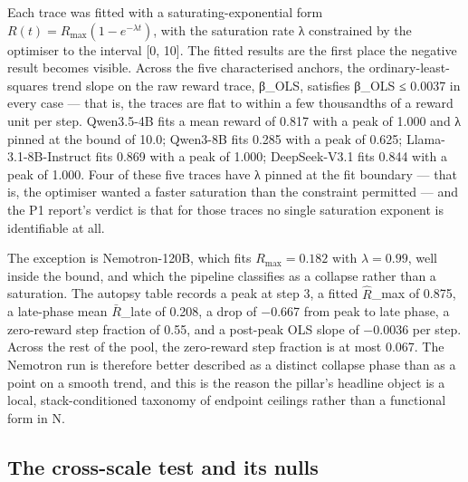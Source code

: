 \documentclass[12pt,a4paper]{report}
\begin{document}
Each trace was fitted with a saturating-exponential form
\(R(t) = R_{\max}(1 - e^{-\lambda t})\), with the saturation rate λ
constrained by the optimiser to the interval {[}0, 10{]}. The fitted
results are the first place the negative result becomes visible. Across
the five characterised anchors, the ordinary-least-squares trend slope
on the raw reward trace, β\_OLS, satisfies \textbar β\_OLS\textbar{} ≤
0.0037 in every case --- that is, the traces are flat to within a few
thousandths of a reward unit per step. Qwen3.5-4B fits a mean reward of
0.817 with a peak of 1.000 and λ pinned at the bound of 10.0; Qwen3-8B
fits 0.285 with a peak of 0.625; Llama-3.1-8B-Instruct fits 0.869 with a
peak of 1.000; DeepSeek-V3.1 fits 0.844 with a peak of 1.000. Four of
these five traces have λ pinned at the fit boundary --- that is, the
optimiser wanted a faster saturation than the constraint permitted ---
and the P1 report's verdict is that for those traces no single
saturation exponent is identifiable at all.

The exception is Nemotron-120B, which fits \(R_{\max} = 0.182\) with
\(\lambda = 0.99\), well inside the bound, and which the pipeline
classifies as a collapse rather than a saturation. The autopsy table
records a peak at step 3, a fitted \ensuremath{\hat{R}}\_max of 0.875, a late-phase mean
\ensuremath{\bar{R}}\_late of 0.208, a drop of −0.667 from peak to late phase, a
zero-reward step fraction of 0.55, and a post-peak OLS slope of −0.0036
per step. Across the rest of the pool, the zero-reward step fraction is
at most 0.067. The Nemotron run is therefore better described as a
distinct collapse phase than as a point on a smooth trend, and this is
the reason the pillar's headline object is a local, stack-conditioned
taxonomy of endpoint ceilings rather than a functional form in N.

\subsection{The cross-scale test and its
nulls}\label{the-cross-scale-test-and-its-nulls}
\end{document}

